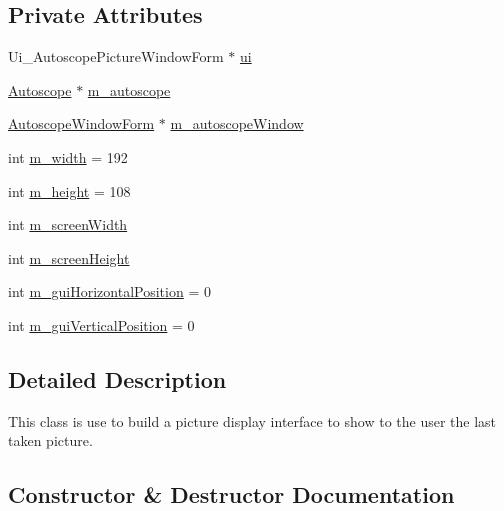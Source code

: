 \subsection*{Private Attributes}
\begin{DoxyCompactItemize}
\item 
Ui\+\_\+\+Autoscope\+Picture\+Window\+Form $\ast$ \mbox{\hyperlink{class_autoscope_picture_window_form_aac9815d1313c1814ff9f0eefa4eeb47d}{ui}}
\item 
\mbox{\hyperlink{class_autoscope}{Autoscope}} $\ast$ \mbox{\hyperlink{class_autoscope_picture_window_form_ab6166280899d69142f4d7ed787c63f8f}{m\+\_\+autoscope}}
\item 
\mbox{\hyperlink{class_autoscope_window_form}{Autoscope\+Window\+Form}} $\ast$ \mbox{\hyperlink{class_autoscope_picture_window_form_ae20e4b58eec25e79ec4a0b5b7fa10e21}{m\+\_\+autoscope\+Window}}
\item 
int \mbox{\hyperlink{class_autoscope_picture_window_form_aa5dacd6f9d13d4cafa98edae38d161f5}{m\+\_\+width}} = 192
\item 
int \mbox{\hyperlink{class_autoscope_picture_window_form_aba2d2633eaffee2cff0babc6db1ab1e4}{m\+\_\+height}} = 108
\item 
int \mbox{\hyperlink{class_autoscope_picture_window_form_a0bf8e1210cdea9fcf58b0153d52b7f6c}{m\+\_\+screen\+Width}}
\item 
int \mbox{\hyperlink{class_autoscope_picture_window_form_a760dd289327d7731dd40dd9f3543588a}{m\+\_\+screen\+Height}}
\item 
int \mbox{\hyperlink{class_autoscope_picture_window_form_ab85a9e8a721d8b8f9d50c03d7dd91eaf}{m\+\_\+gui\+Horizontal\+Position}} = 0
\item 
int \mbox{\hyperlink{class_autoscope_picture_window_form_acc65dba5ea960c1c8e38267b913a67d3}{m\+\_\+gui\+Vertical\+Position}} = 0
\end{DoxyCompactItemize}


\subsection{Detailed Description}
This class is use to build a picture display interface to show to the user the last taken picture. 

\subsection{Constructor \& Destructor Documentation}
\mbox{\label{class_autoscope_picture_window_form_ac7e1f8a94457cce24469119ea3214f8a}} 
